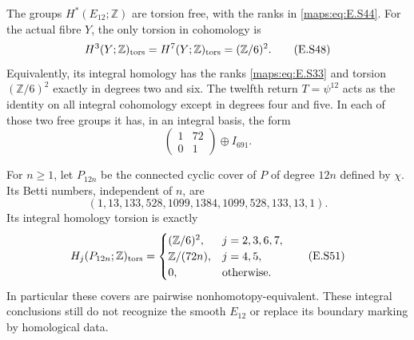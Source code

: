 \begin{theorem}\label{maps:src:E.2.15}


The groups $H^*(E_{12};\mathbb Z)$ are torsion free, with
the ranks in \eqref{maps:eq:E.S44}. For the actual fibre $Y$, the only
torsion in cohomology is
\[
       H^3(Y;\mathbb Z)_{\rm tors}
       =H^7(Y;\mathbb Z)_{\rm tors}=(\mathbb Z/6)^2.
 \tag{E.S48}\label{maps:eq:E.S48}
\]
Equivalently, its integral homology has the ranks \eqref{maps:eq:E.S33}
and torsion $(\mathbb Z/6)^2$ exactly in degrees two and six.
The twelfth return $T=\psi^{12}$ acts as the identity on
all integral cohomology except in degrees four and five.
In each of those two free groups it has, in an integral
basis, the form
\[
             \begin{pmatrix}1&72\\0&1\end{pmatrix}
                                  \oplus I_{691}.
 \tag{E.S49}\label{maps:eq:E.S49}
\]

For $n\geq1$, let $P_{12n}$ be the connected cyclic cover
of $P$ of degree $12n$ defined by $\chi$. Its Betti numbers,
independent of $n$, are
\[
       (1,13,133,528,1099,1384,1099,528,133,13,1).
 \tag{E.S50}\label{maps:eq:E.S50}
\]
Its integral homology torsion is exactly
\[
 H_j(P_{12n};\mathbb Z)_{\rm tors}=
 \begin{cases}
       (\mathbb Z/6)^2,&j=2,3,6,7,\\
       \mathbb Z/(72n),&j=4,5,\\
       0,&\text{otherwise}.
 \end{cases}
 \tag{E.S51}\label{maps:eq:E.S51}
\]
In particular these covers are pairwise nonhomotopy-equivalent.
These integral conclusions still do not recognize the smooth
$E_{12}$ or replace its boundary marking by homological data.

\end{theorem}


